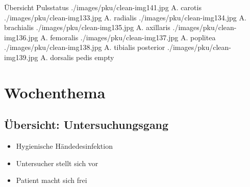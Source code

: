 \begin{PictureSeriesWide}{}{Übersicht Pulsstatus}
{./images/pku/clean-img141.jpg}
{A. carotis}
{./images/pku/clean-img133.jpg}
{A. radialis}
{./images/pku/clean-img134.jpg}
{A. brachialis }
{}
{}
{./images/pku/clean-img135.jpg}
{A. axillaris}
{./images/pku/clean-img136.jpg}
{A. femoralis }
{./images/pku/clean-img137.jpg}
{A. poplitea }
{}
{}
{./images/pku/clean-img138.jpg}
{A. tibialis posterior}
{./images/pku/clean-img139.jpg}
{A. dorsalis pedis }
{empty}
{}
{}
{}
\end{PictureSeriesWide}








\clearpage
\section
[Wochenthema \CO{[D]}]
{Wochenthema \CC{[D]}}


\subsection{Übersicht: Untersuchungsgang}
{\begin{itemize}
  \item Hygienische Händedesinfektion
  \item Untersucher stellt sich vor
  \item Patient macht sich frei
\end{itemize}}
{}
{}
{}
{}

